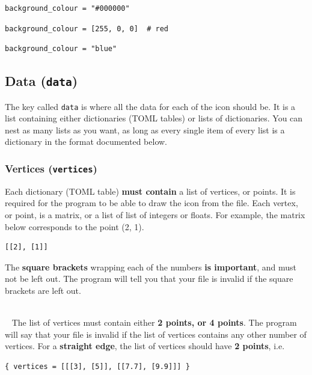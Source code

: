 \documentclass[11pt]{article}
\begin{document}
\begin{verbatim}
background_colour = "#000000"
\end{verbatim}

\begin{verbatim}
background_colour = [255, 0, 0]  # red
\end{verbatim}

\begin{verbatim}
background_colour = "blue"
\end{verbatim}

\subsection{Data (\texttt{data})}
\label{sec:orge9dfe9f}
The key called \texttt{data} is where all the data for each of the icon should be. It is a list containing either dictionaries (TOML tables) or lists of dictionaries. You can nest as many lists as you want, as long as every single item of every list is a dictionary in the format documented below.

 \newpage

\subsubsection{Vertices (\texttt{vertices})}
\label{sec:org08d4d55}
Each dictionary (TOML table) \textbf{must contain} a list of vertices, or points. It is required for the program to be able to draw the icon from the file. Each vertex, or point, is a matrix, or a list of list of integers or floats. For example, the matrix below corresponds to the point (2, 1).
\begin{verbatim}
[[2], [1]]
\end{verbatim}

 \noindent The \textbf{square brackets} wrapping each of the numbers \textbf{is important}, and must not be left out. The program will tell you that your file is invalid if the square brackets are left out.

 ~\\~ \noindent The list of vertices must contain either \textbf{2 points, or 4 points}. The program will say that your file is invalid if the list of vertices contains any other number of vertices. For a \textbf{straight edge}, the list of vertices should have \textbf{2 points}, i.e.
\begin{verbatim}
{ vertices = [[[3], [5]], [[7.7], [9.9]]] }
\end{verbatim}
\end{document}
